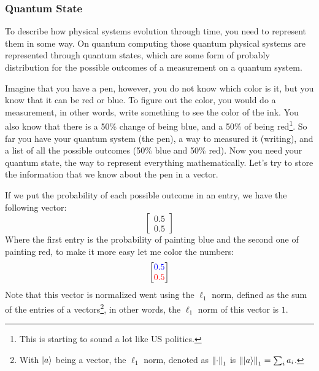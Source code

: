 \subsubsection{Quantum State}
To describe how physical systems evolution through time, you need to represent them in some way. On quantum computing those quantum physical systems are represented through quantum states, which are some form of probably distribution for the possible outcomes of a measurement on a quantum system.

Imagine that you have a pen, however, you do not know which color is it, but you know that it can be red or blue. To figure out the color, you would do a measurement, in other words, write something to see the color of the ink. You also know that there is a 50\% change of being blue, and a 50\% of being red\footnote{This is starting to sound a lot like US politics.}. So far you have your quantum system (the pen), a way to measured it (writing), and a list of all the possible outcomes (50\% blue and 50\% red). Now you need your quantum state, the way to represent everything mathematically. Let's try to store the information that we know about the pen in a vector.

If we put the probability of each possible outcome in an entry, we have the following vector:
$$
\begin{bmatrix}
	0.5 \\
	0.5
\end{bmatrix}
$$
Where the first entry is the probability of painting blue and the second one of painting red, to make it more easy let me color the numbers:
$$
\begin{bmatrix}
	\textcolor{blue}{0.5} \\
	\textcolor{red}{0.5}
\end{bmatrix}
$$
Note that this vector is normalized went using the $\ell_1$ norm, defined as the sum of the entries of a vectors\footnote{With $\ket{a}$ being a vector, the $\ell_1$ norm, denoted as $\norm{\cdot}_1$ is $\norm{\ket{a}}_1 = \sum_i a_i$.}, in other words, the $\ell_1$ norm of this vector is $1$.

